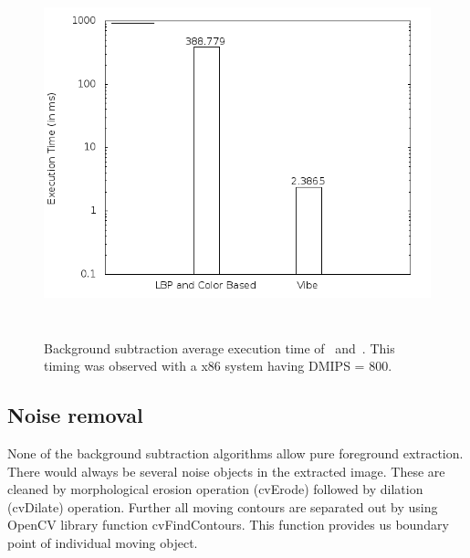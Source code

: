\begin{figure}[!b]
\centering
\includegraphics[height=300pt]{Figures/bg_compare}
\caption{Background subtraction average execution time of~\cite{11}
and~\cite{9}. This timing was observed with a x86 system having DMIPS =
800.}
\label{bg_compare}
\end{figure}
\subsection{Noise removal}
\indent None of the background subtraction algorithms allow pure
foreground extraction. There would always be several noise objects in the
extracted image. These are cleaned by morphological erosion operation
(cvErode) followed by dilation (cvDilate) operation. Further all moving
contours are separated out by using OpenCV library function
cvFindContours. This function provides us boundary point of individual
moving object.
